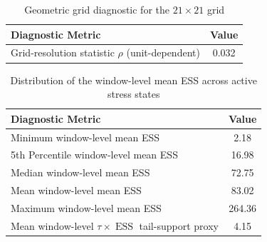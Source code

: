 \documentclass[11pt, a4paper]{article}
\begin{document}
\begin{table}[htbp]
\centering
\caption{Computational benchmark: adaptive exchange algorithm vs. dense grid approximation}
\label{tab:computational}
\end{table}

\begin{table}[htbp]
\centering
\caption{Geometric grid diagnostic for the $21\times21$ grid}
\label{tab:grid_bounds}
\begin{tabular}{lc}
\toprule
\textbf{Diagnostic Metric} & \textbf{Value} \\
\midrule
Grid-resolution statistic $\rho$ (unit-dependent) & 0.032 \\
\bottomrule
\end{tabular}
\end{table}

\begin{table}[htbp]
\centering
\caption{Distribution of the window-level mean ESS across active stress states}
\label{tab:ess_diagnostics}
\begin{tabular}{lc}
\toprule
\textbf{Diagnostic Metric} & \textbf{Value} \\
\midrule
Minimum window-level mean ESS & 2.18 \\
5th Percentile window-level mean ESS & 16.98 \\
Median window-level mean ESS & 72.75 \\
Mean window-level mean ESS & 83.02 \\
Maximum window-level mean ESS & 264.36 \\
Mean window-level $\tau\times \operatorname{ESS}$ tail-support proxy & 4.15 \\
\bottomrule
\end{tabular}
\end{table}
\end{document}
